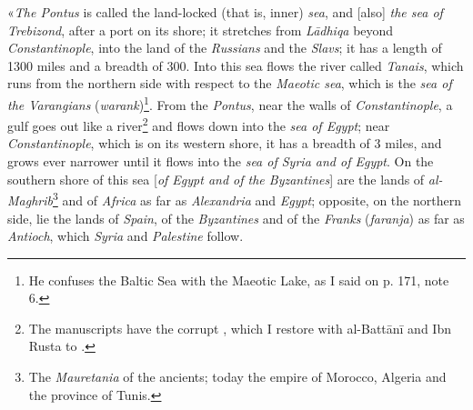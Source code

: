 \documentclass[11pt]{article}
\newcommand{\Pg}[1]{\marginpar{\footnotesize\color{gray}#1}}
\begin{document}
\par \Pg{I 172}«\emph{The Pontus} is called the land-locked (that is, inner) \emph{sea}, and [also] \emph{the sea of Trebizond}, after a port on its shore; it stretches from \emph{Lādhiqa} beyond \emph{Constantinople}, into the land of the \emph{Russians} and the \emph{Slavs}; it has a length of 1300 miles and a breadth of 300. Into this sea flows the river called \emph{Tanais}, which runs from the northern side with respect to the \emph{Maeotic sea}, which is the \emph{sea of the Varangians} (\emph{warank})\footnote{He confuses the Baltic Sea with the Maeotic Lake, as I said on p. 171, note 6.}. From the \emph{Pontus}, near the walls of \emph{Constantinople}, a gulf goes out like a river\footnote{The manuscripts have the corrupt , which I restore with al-Battānī and Ibn Rusta to .} and flows down into the \emph{sea of Egypt}; near \emph{Constantinople}, which is on its western shore, it has a breadth of 3 miles, and grows ever narrower until it flows into the \emph{sea of Syria and of Egypt}. On the southern shore of this sea [\emph{of Egypt and of the Byzantines}] are the lands of \emph{al-Maghrib}\footnote{The \emph{Mauretania} of the ancients; today the empire of Morocco, Algeria and the province of Tunis.} and of \emph{Africa} as far as \emph{Alexandria} and \emph{Egypt}; opposite, on the northern side, lie the lands of \emph{Spain}, of the \emph{Byzantines} and of the \emph{Franks} (\emph{faranja}) as far as \emph{Antioch}, which \emph{Syria} and \emph{Palestine} follow.\par
\end{document}
